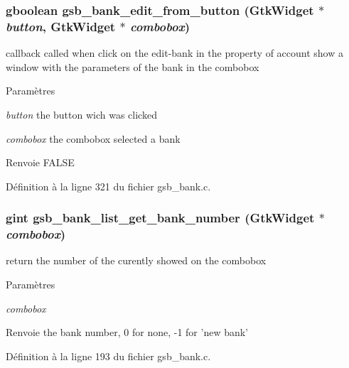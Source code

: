 \subsubsection[{gsb\_\-bank\_\-edit\_\-from\_\-button}]{\setlength{\rightskip}{0pt plus 5cm}gboolean gsb\_\-bank\_\-edit\_\-from\_\-button (GtkWidget $\ast$ {\em button}, \/  GtkWidget $\ast$ {\em combobox})}\label{gsb__bank_8h_ae61d311db2db4446a87481841f9b1424}
callback called when click on the edit-\/bank in the property of account show a window with the parameters of the bank in the combobox


\begin{DoxyParams}{Paramètres}
\item[{\em button}]the button wich was clicked \item[{\em combobox}]the combobox selected a bank\end{DoxyParams}
\begin{DoxyReturn}{Renvoie}
FALSE 
\end{DoxyReturn}


Définition à la ligne 321 du fichier gsb\_\-bank.c.

\subsubsection[{gsb\_\-bank\_\-list\_\-get\_\-bank\_\-number}]{\setlength{\rightskip}{0pt plus 5cm}gint gsb\_\-bank\_\-list\_\-get\_\-bank\_\-number (GtkWidget $\ast$ {\em combobox})}\label{gsb__bank_8h_af530b323e9bc34311e37d3795bddb807}
return the number of the curently showed on the combobox


\begin{DoxyParams}{Paramètres}
\item[{\em combobox}]\end{DoxyParams}
\begin{DoxyReturn}{Renvoie}
the bank number, 0 for none, -\/1 for 'new bank' 
\end{DoxyReturn}


Définition à la ligne 193 du fichier gsb\_\-bank.c.

